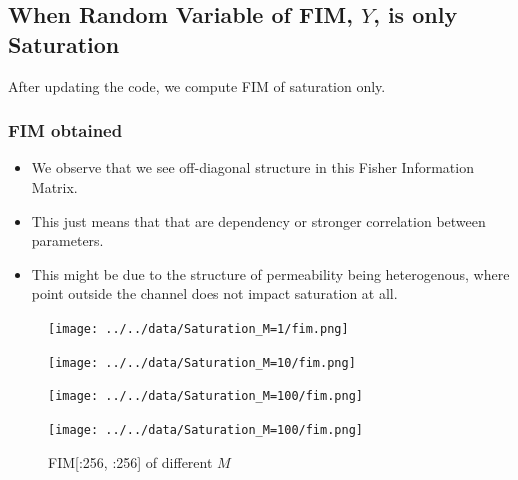 \documentclass[
]{article}
\providecommand{\tightlist}{%
  \setlength{\itemsep}{0pt}\setlength{\parskip}{0pt}}\usepackage{longtable,booktabs,array}
\begin{document}
\subsection{\texorpdfstring{When Random Variable of FIM, \(Y\), is only
Saturation}{When Random Variable of FIM, Y, is only Saturation}}\label{when-random-variable-of-fim-y-is-only-saturation}

After updating the code, we compute FIM of saturation only.

\subsubsection{FIM obtained}\label{fim-obtained}

\begin{itemize}
\tightlist
\item
  We observe that we see off-diagonal structure in this Fisher
  Information Matrix.
\item
  This just means that that are dependency or stronger correlation
  between parameters.
\item
  This might be due to the structure of permeability being heterogenous,
  where point outside the channel does not impact saturation at all.
\end{itemize}

\begin{figure}

\begin{minipage}{0.25\linewidth}

\texttt{[image: ../../data/Saturation\_M=1/fim.png]}

\end{minipage}%
%
\begin{minipage}{0.25\linewidth}

\texttt{[image: ../../data/Saturation\_M=10/fim.png]}

\end{minipage}%
%
\begin{minipage}{0.25\linewidth}

\texttt{[image: ../../data/Saturation\_M=100/fim.png]}

\end{minipage}%
%
\begin{minipage}{0.25\linewidth}

\texttt{[image: ../../data/Saturation\_M=100/fim.png]}

\end{minipage}%

\caption{\label{fig-fim}FIM{[}:256, :256{]} of different \(M\)}

\end{figure}%
\end{document}
